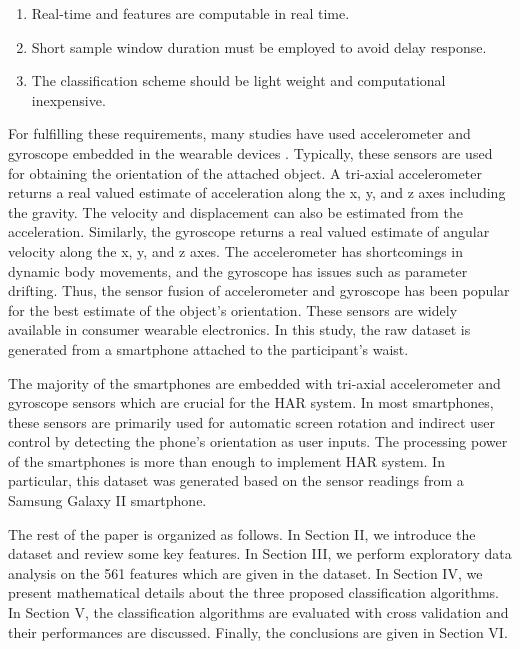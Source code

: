 \documentclass[conference]{IEEEtran}
\begin{document}
\begin{enumerate}
\item Real-time and features are computable in real time.
\item Short sample window duration must be employed to avoid delay response.
\item The classification scheme should be light weight and computational inexpensive.\\
\end{enumerate}

For fulfilling these requirements, many studies have used accelerometer and gyroscope embedded in the wearable devices \cite{bayat2014study,kwapisz2011activity,lara2013survey,wuhuman}. Typically, these sensors are used for obtaining the orientation of the attached object. A tri-axial accelerometer returns a real valued estimate of acceleration along the x, y, and z axes including the gravity. The velocity and displacement can also be estimated from the acceleration. Similarly, the gyroscope returns a real valued estimate of angular velocity along the x, y, and z axes. The accelerometer has shortcomings in dynamic body movements, and the gyroscope has issues such as parameter drifting. Thus, the sensor fusion of accelerometer and gyroscope has been popular for the best estimate of the object's orientation. These sensors are widely available in consumer wearable electronics. In this study, the raw dataset is generated from a smartphone attached to the participant's waist. 

The majority of the smartphones are embedded with tri-axial accelerometer and gyroscope sensors which are crucial for the HAR system. In most smartphones, these sensors are primarily used for automatic screen rotation and indirect user control by detecting the phone's orientation as user inputs. The processing power of the smartphones is more than enough to implement HAR system. In particular, this dataset was generated based on the sensor readings from a Samsung Galaxy II smartphone.

The rest of the paper is organized as follows. In Section II, we introduce the dataset and review some key features. In Section III, we perform exploratory data analysis on the 561 features which are given in the dataset. In Section IV, we present mathematical details about the three proposed classification algorithms. In Section V, the classification algorithms are evaluated with cross validation and their performances are discussed. Finally, the conclusions are given in Section VI. 
\end{document}
